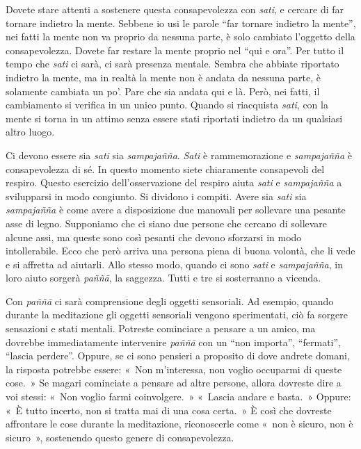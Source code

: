 Dovete stare attenti a sostenere questa consapevolezza con \emph{sati},
e cercare di far tornare indietro la mente. Sebbene io usi le parole
``far tornare indietro la mente'', nei fatti la mente non va proprio da
nessuna parte, è solo cambiato l'oggetto della consapevolezza. Dovete
far restare la mente proprio nel ``qui e ora''. Per tutto il tempo che
\emph{sati} ci sarà, ci sarà presenza mentale. Sembra che abbiate
riportato indietro la mente, ma in realtà la mente non è andata da
nessuna parte, è solamente cambiata un po'. Pare che sia andata qui e
là. Però, nei fatti, il cambiamento si verifica in un unico punto.
Quando si riacquista \emph{sati}, con la mente si torna in un attimo
senza essere stati riportati indietro da un qualsiasi altro luogo.

Ci devono essere sia \emph{sati} sia \emph{sampajañña}. \emph{Sati} è
rammemorazione e \emph{sampajañña} è consapevolezza di sé. In questo
momento siete chiaramente consapevoli del respiro. Questo esercizio
dell'osservazione del respiro aiuta \emph{sati} e \emph{sampajañña} a
svilupparsi in modo congiunto. Si dividono i compiti. Avere sia
\emph{sati} sia \emph{sampajañña} è come avere a disposizione due
manovali per sollevare una pesante asse di legno. Supponiamo che ci
siano due persone che cercano di sollevare alcune assi, ma queste sono
così pesanti che devono sforzarsi in modo intollerabile. Ecco che però
arriva una persona piena di buona volontà, che li vede e si affretta ad
aiutarli. Allo stesso modo, quando ci sono \emph{sati} e
\emph{sampajañña}, in loro aiuto sorgerà \emph{paññā}, la saggezza.
Tutti e tre si sosterranno a vicenda.

Con \emph{paññā} ci sarà comprensione degli oggetti sensoriali. Ad
esempio, quando durante la meditazione gli oggetti sensoriali vengono
sperimentati, ciò fa sorgere sensazioni e stati mentali. Potreste
cominciare a pensare a un amico, ma dovrebbe immediatamente intervenire
\emph{paññā} con un ``non importa'', ``fermati'', ``lascia perdere''.
Oppure, se ci sono pensieri a proposito di dove andrete domani, la
risposta potrebbe essere: «~Non m'interessa, non voglio occuparmi di
queste cose.~» Se magari cominciate a pensare ad altre persone, allora
dovreste dire a voi stessi: «~Non voglio farmi coinvolgere.~» «~Lascia
andare e basta.~» Oppure: «~È tutto incerto, non si tratta mai di una
cosa certa.~» È così che dovreste affrontare le cose durante la
meditazione, riconoscerle come «~non è sicuro, non è sicuro~»,
sostenendo questo genere di consapevolezza.

